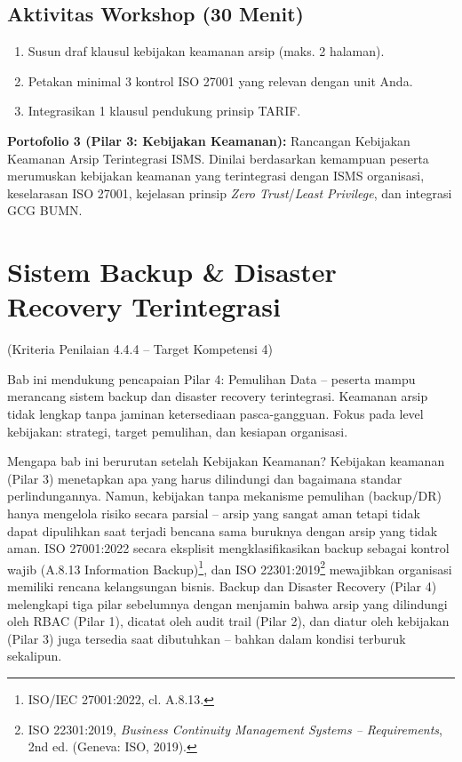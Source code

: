 \documentclass[12pt,a4paper]{report}
\begin{document}

\section{Aktivitas Workshop (30 Menit)}
\begin{enumerate}[leftmargin=*]
    \item Susun draf klausul kebijakan keamanan arsip (maks. 2 halaman).
    \item Petakan minimal 3 kontrol ISO 27001 yang relevan dengan unit Anda.
    \item Integrasikan 1 klausul pendukung prinsip TARIF.
\end{enumerate}

\begin{outputbox}
\textbf{Portofolio 3 (Pilar 3: Kebijakan Keamanan):} Rancangan Kebijakan Keamanan Arsip Terintegrasi ISMS. Dinilai berdasarkan kemampuan peserta merumuskan kebijakan keamanan yang terintegrasi dengan ISMS organisasi, keselarasan ISO 27001, kejelasan prinsip \textit{Zero Trust}/\textit{Least Privilege}, dan integrasi GCG BUMN.
\end{outputbox}

\chapter{Sistem Backup \& Disaster Recovery Terintegrasi}
(Kriteria Penilaian 4.4.4 -- Target Kompetensi 4)

Bab ini mendukung pencapaian Pilar 4: Pemulihan Data -- peserta mampu merancang sistem backup dan disaster recovery terintegrasi. Keamanan arsip tidak lengkap tanpa jaminan ketersediaan pasca-gangguan. Fokus pada level kebijakan: strategi, target pemulihan, dan kesiapan organisasi.

Mengapa bab ini berurutan setelah Kebijakan Keamanan? Kebijakan keamanan (Pilar 3) menetapkan apa yang harus dilindungi dan bagaimana standar perlindungannya. Namun, kebijakan tanpa mekanisme pemulihan (backup/DR) hanya mengelola risiko secara parsial -- arsip yang sangat aman tetapi tidak dapat dipulihkan saat terjadi bencana sama buruknya dengan arsip yang tidak aman. ISO 27001:2022 secara eksplisit mengklasifikasikan backup sebagai kontrol wajib (A.8.13 Information Backup)\footnote{ISO/IEC 27001:2022, cl. A.8.13.}, dan ISO 22301:2019\footnote{ISO 22301:2019, \textit{Business Continuity Management Systems -- Requirements}, 2nd ed. (Geneva: ISO, 2019).} mewajibkan organisasi memiliki rencana kelangsungan bisnis. Backup dan Disaster Recovery (Pilar 4) melengkapi tiga pilar sebelumnya dengan menjamin bahwa arsip yang dilindungi oleh RBAC (Pilar 1), dicatat oleh audit trail (Pilar 2), dan diatur oleh kebijakan (Pilar 3) juga tersedia saat dibutuhkan -- bahkan dalam kondisi terburuk sekalipun.
\end{document}
